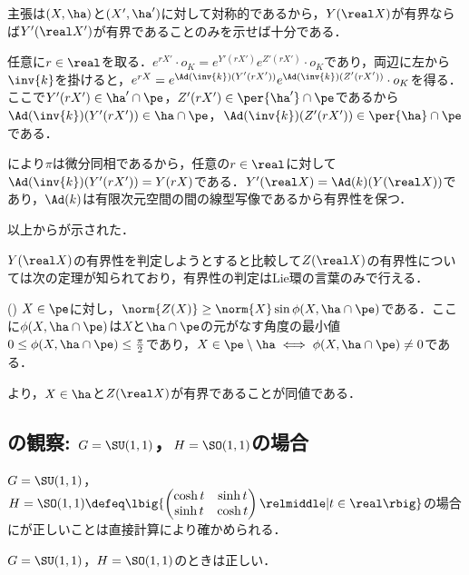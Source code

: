 \begin{npfwn}
  主張は$(X,\ha) $と$(X',\ha')$に対して対称的であるから，$Y(\real X) $が有界ならば$Y'(\real X') $が有界であることのみを示せば十分である．

  任意に$r\in \real$を取る．$e^{rX'}\cdot o_K = e^{Y'(r X')}e^{Z'(r X')}\cdot o_K  $であり，両辺に左から$\inv{k} $を掛けると，$e^{r X} = e^{\Ad(\inv{k})( Y'(r X'))}e^{\Ad(\inv{k})( Z'(r X'))}\cdot o_K  $を得る．ここで$Y'(rX')\in \ha'\cap \pe $，$Z'(r X')\in \per{\ha'}\cap \pe $であるから$\Ad(\inv{k})(Y'(r X'))\in \ha\cap \pe $，$\Ad(\inv{k})(Z'(r X')) \in \per{\ha}\cap \pe $である．

  により$\pi$は微分同相であるから，任意の$r\in \real$に対して$\Ad(\inv{k})(Y'(r X')) = Y(rX)  $である．$Y'(\real X) = \Ad(k)(Y(\real X))  $であり，$\Ad(k) $は有限次元空間の間の線型写像であるから有界性を保つ．

  以上からが示された．  
\end{npfwn}


$Y(\real X) $の有界性を判定しようとすると比較して$Z(\real X) $の有界性については次の定理が知られており，有界性の判定はLie環の言葉のみで行える．

\begin{thm}(\cite[Lemmma~5.4]{kob97})\label{thm:kob97}
  $X\in \pe$に対し，$\norm{Z(X)}\geq \norm{X} \sin\phi(X, \ha\cap\pe)$である．ここに$\phi(X,\ha\cap \pe) $は$X$と$\ha\cap \pe$の元がなす角度の最小値${0\leq \phi(X,\ha\cap \pe) \leq \frac{\pi}{2}} $であり，$X\in \pe\setminus \ha \iff \phi(X,\ha\cap \pe)\neq 0 $である．
\end{thm}

より，$X\in \ha $と$Z(\real X) $が有界であることが同値である．


\subsection{の観察: $G = \SU(1,1) $，$H = \SO(1,1) $の場合}

$G = \SU(1,1) $，$H = \SO(1,1) \defeq\lbig\{
\begin{pmatrix}
  \cosh t & \sinh t\\ \sinh t & \cosh t
\end{pmatrix}
\relmiddle| t\in \real \rbig\} $の場合にが正しいことは直接計算により確かめられる．

\begin{prop}\label{prop:prob-eg}
  $G = \SU(1,1) $，$H = \SO(1,1) $のときは正しい．
\end{prop}

